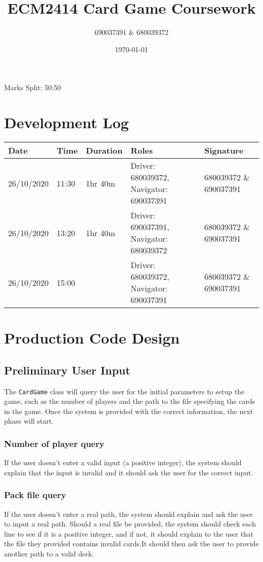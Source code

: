 \documentclass[a4paper, 11pt] {article}
\begin{document}
\title{ECM2414 Card Game Coursework}
\author{690037391 \& 680039372}
\date{\today}
\maketitle
	\begin{center}
		Marks Split: 50:50
	\end{center}
\pagebreak
\section*{Development Log}
\FloatBarrier
\begin{table}[]
\begin{tabular}{|l|l|l|l|l|}
\hline
Date        & Time     & Duration & Roles                                   & Signature              \\ \hline
 26/10/2020 & 11:30    & 1hr 40m  & Driver: 680039372, Navigator: 690037391 & 680039372 \& 690037391 \\ \hline
 26/10/2020 & 13:20    & 1hr 40m  & Driver: 690037391, Navigator: 680039372 & 680039372 \& 690037391 \\ \hline
 26/10/2020 & 15:00    &          & Driver: 680039372, Navigator: 690037391 & 680039372 \& 690037391 \\ \hline
\end{tabular}
\end{table}
\pagebreak
\section*{Production Code Design}
\subsection*{Preliminary User Input}
The \texttt{CardGame} class will query the user for the initial parameters to setup the game, such as the number of players and the path to the file specifying the cards in the game. Once the system is provided with the correct information, the next phase will start.
\subsubsection*{Number of player query}
If the user doesn't enter a valid input (a positive integer), the system should explain that the input is invalid and it should ask the user for the correct input.
\subsubsection*{Pack file query}
If the user doesn't enter a real path, the system should explain and ask the user to input a real path.
Should a real file be provided, the system should check each line to see if it is a positive integer, and if not, it should explain to the user that the file they provided contains invalid cards.It should then ask the user to provide another path to a valid deck.
\end{document}
